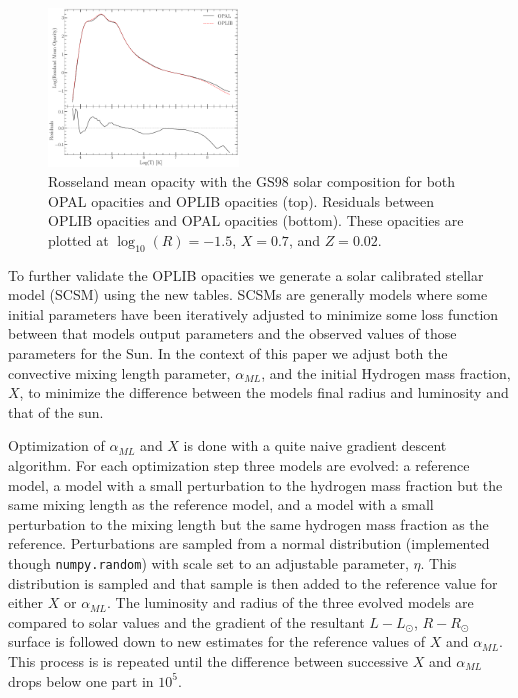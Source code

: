 \begin{figure}
	\centering
	\includegraphics[width=0.45\textwidth]{src/figures/OpacityComparision.pdf}
	\caption{Rosseland mean opacity with the GS98 solar composition for both
		OPAL opacities and OPLIB opacities (top). Residuals between OPLIB
		opacities and OPAL opacities (bottom). These opacities are plotted at
		$\log _{10}(R) = -1.5$, $X=0.7$, and $Z=0.02$.}
	\label{fig:OpacCompare}
\end{figure}

To further validate the OPLIB opacities we generate a solar calibrated stellar
model (SCSM) using the new tables. SCSMs are generally models where some
initial parameters have been iteratively adjusted to minimize some loss function
between that models output parameters and the observed values of those
parameters for the Sun. In the context of this paper we adjust both the
convective mixing length parameter, $\alpha_{ML}$, and the initial Hydrogen
mass fraction, $X$, to minimize the difference between the models final radius
and luminosity and that of the sun.

Optimization of $\alpha_{ML}$ and $X$ is done with a quite naive gradient
descent algorithm. For each optimization step three models are evolved: a reference
model, a model with a small perturbation to the hydrogen mass fraction but the
same mixing length as the reference model, and a model with a small
perturbation to the mixing length but the same hydrogen mass fraction as the
reference. Perturbations are sampled from a normal distribution (implemented
though \texttt{numpy.random}) with scale set to an adjustable parameter,
$\eta$. This distribution is sampled and that sample is then added to the
reference value for either $X$ or $\alpha_{ML}$. The luminosity and radius of
the three evolved models are compared to solar values and the gradient of the
resultant $L-L_{\odot}$, $R-R_{\odot}$ surface is followed down to new
estimates for the reference values of $X$ and $\alpha_{ML}$. This process is
is repeated until the difference between successive $X$ and $\alpha_{ML}$ drops
below one part in $10^{5}$.

